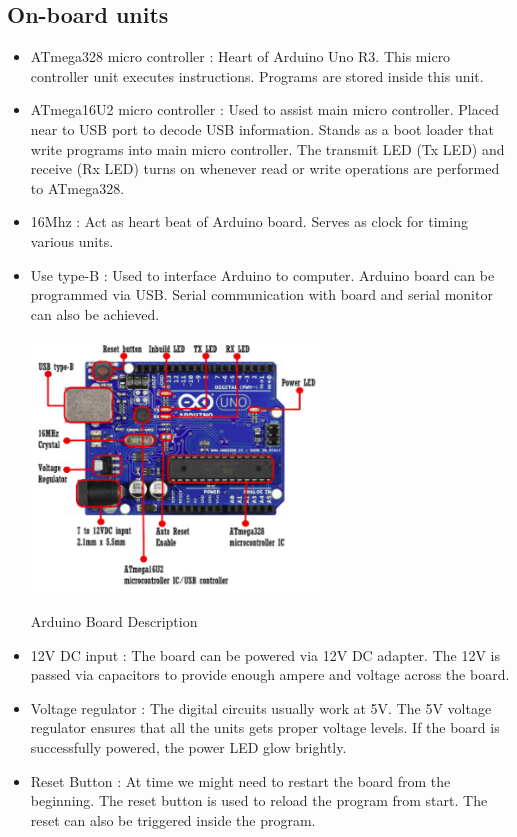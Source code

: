 \subsection{On-board units}
\begin{itemize}
    \item ATmega328 micro controller : Heart of Arduino Uno R3. This micro controller unit executes instructions. Programs are stored inside this unit.
    \item ATmega16U2 micro controller : Used to assist main micro controller. Placed near to USB port to decode USB information. Stands as a boot loader that write programs into main micro controller. The transmit LED (Tx LED) and receive (Rx LED) turns on whenever read or write operations are performed to ATmega328. 
    \item 16Mhz : Act as heart beat of Arduino board. Serves as clock for timing various units.
    \item Use type-B : Used to interface Arduino to computer. Arduino board can be programmed via USB. Serial communication with board and serial monitor can also be achieved.
    \begin{marginfigure}
     \hspace{-1in}\includegraphics[width=3in]{Chapters/images/ard_boarddesp.png}
    \caption{Arduino Board Description}
    \end{marginfigure} 
    \item 12V DC input : The board can be powered via 12V DC adapter. The 12V is passed via capacitors to provide enough ampere and voltage across the board.
    \item Voltage regulator : The digital circuits usually work at 5V. The 5V voltage regulator ensures that all the units gets proper voltage levels. If the board is successfully powered, the power LED glow brightly.
    \item Reset Button : At time we might need to restart the board from the beginning. The reset button is used to reload the program from start. The reset can also be triggered inside the program.
\end{itemize}

